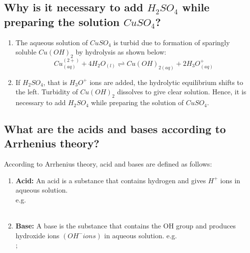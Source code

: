 \documentclass{article}
\begin{document}
   \subsection{Why is it necessary to add $H_2SO_4$ while preparing the 
   solution $CuSO_4$?}
   \begin{enumerate}
   	\item The aqueous solution of $CuSO_4$ is turbid due to formation of
	sparingly soluble $Cu(OH)_2$ by hydrolysis as shown below:
	\begin{equation}
		Cu_{(aq)}^{(2+)} + 4H_2O_(l) \rightleftharpoons{}
		Cu(OH)_{2(aq)} + 2H_3O_{(aq)}^+
	\end{equation}
	\item If $H_2SO_4$, that is $H_3O^+$ ions are added, the hydrolytic
	equilibrium shifts to the left. Turbidity of $Cu(OH)_2$ dissolves
	to give clear solution. Hence, it is necessary to add $H_2SO_4$
	while preparing the solution of $CuSO_4$.
   \end{enumerate}

   \subsection{What are the acids and bases according to Arrhenius theory?}
   According to Arrhenius theory, acid and bases are defined as follows:
   \begin{enumerate}
   	\item \textbf{Acid:} An acid is a substance that contains hydrogen 
	and gives $H^+$ ions in aqueous solution. \\
   	e.g. \\
   	 \\

	\item \textbf{Base:} A base is the substance that contains the OH
	group and produces hydroxide ions $(OH^- ions)$ in aqueous solution.
	e.g.\\
	 ; \\
   	\end{enumerate}
\end{document}
